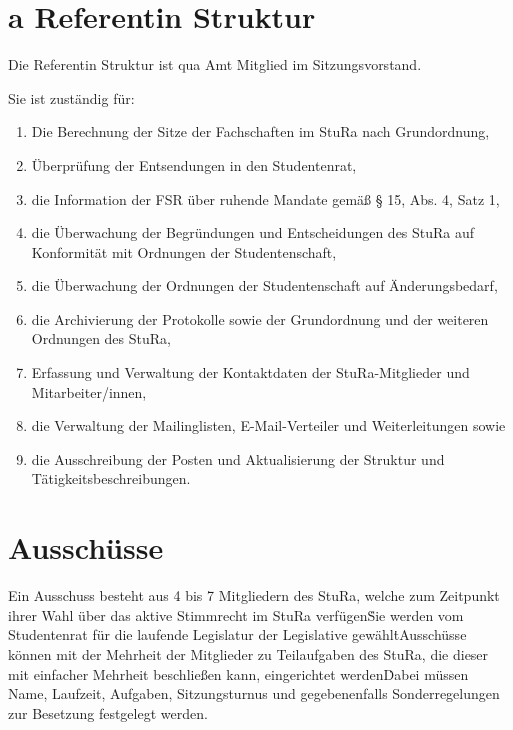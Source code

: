 \begin{multicols}{2}
\setcounter{section}{22}
\section{a Referentin Struktur}

\Abs \Satz Die Referentin Struktur ist qua Amt Mitglied im Sitzungsvorstand.

\Abs \Satz Sie ist zuständig für:
\begin{enumerate}
\item Die Berechnung der Sitze der Fachschaften im StuRa nach Grundordnung,
\item Überprüfung der Entsendungen in den Studentenrat,
\item die Information der FSR über ruhende Mandate gemäß § 15, Abs. 4, Satz 1,
\item die Überwachung der Begründungen und Entscheidungen des StuRa auf Konformität mit Ordnungen der Studentenschaft,
\item die Überwachung der Ordnungen der Studentenschaft auf Änderungsbedarf,
\item die Archivierung der Protokolle sowie der Grundordnung und der weiteren Ordnungen des StuRa,
\item Erfassung und Verwaltung der Kontaktdaten der StuRa-Mitglieder und Mitarbeiter/innen,
\item die Verwaltung der Mailinglisten, E-Mail-Verteiler und Weiterleitungen sowie
\item die Ausschreibung der Posten und Aktualisierung der Struktur und Tätigkeitsbeschreibungen.
\end{enumerate}


\setcounter{section}{23}


\section{Ausschüsse} %

\Abs \Satz Ein Ausschuss besteht aus 4 bis 7 Mitgliedern des StuRa, welche zum Zeitpunkt ihrer Wahl über das aktive Stimmrecht im StuRa verfügen\. Sie werden vom Studentenrat für die laufende Legislatur der Legislative gewählt\.

\Abs \Satz Ausschüsse können mit der Mehrheit der Mitglieder zu Teilaufgaben des StuRa, die dieser mit einfacher Mehrheit beschließen kann, eingerichtet werden\. Dabei müssen Name, Laufzeit, Aufgaben, Sitzungsturnus und gegebenenfalls Sonderregelungen zur Besetzung festgelegt werden.


\end{multicols}

